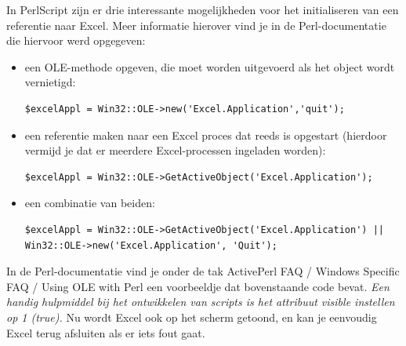 \documentclass[11pt,a4paper]{report}
\begin{document}
\par In PerlScript zijn er drie interessante mogelijkheden voor het initialiseren van een referentie naar Excel. Meer informatie hierover vind je in de Perl-documentatie die hiervoor werd opgegeven:
\begin{itemize}
	\item  een OLE-methode opgeven, die moet worden uitgevoerd als het object wordt vernietigd:
\begin{lstlisting}
$excelAppl = Win32::OLE->new('Excel.Application','quit');
\end{lstlisting}
	\item een referentie maken naar een Excel proces dat reeds is opgestart (hierdoor vermijd je dat er meerdere Excel-processen ingeladen worden):
	\begin{lstlisting}
$excelAppl = Win32::OLE->GetActiveObject('Excel.Application');
\end{lstlisting}
	\item een combinatie van beiden:
	\begin{lstlisting}
$excelAppl = Win32::OLE->GetActiveObject('Excel.Application') || Win32::OLE->new('Excel.Application', 'Quit');
\end{lstlisting}
\end{itemize}
In de Perl-documentatie vind je onder de tak ActivePerl FAQ / Windows Specific FAQ / Using OLE with Perl een voorbeeldje dat bovenstaande code bevat.
\textit{Een handig hulpmiddel bij het ontwikkelen van scripts is het attribuut visible instellen op 1 (true).} Nu wordt Excel ook op het scherm getoond, en kan je eenvoudig Excel terug afsluiten als er iets fout gaat.
\end{document}
